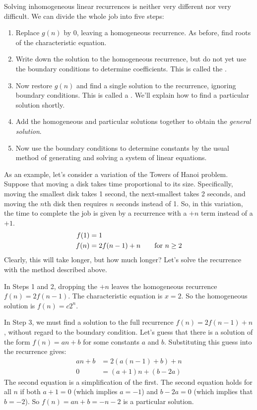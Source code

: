 Solving inhomogeneous linear recurrences is neither very different nor
very difficult. We can divide the whole job into five steps:

\begin{enumerate}

\item Replace $g(n)$ by 0, leaving a homogeneous recurrence.  As
  before, find roots of the characteristic equation.

\item Write down the solution to the homogeneous recurrence, but do
  not yet use the boundary conditions to determine coefficients.  This
  is called the .

\item Now restore $g(n)$ and find a single solution to the recurrence,
  ignoring boundary conditions.  This is called a .  We'll explain how to find a particular solution
  shortly.

\item Add the homogeneous and particular solutions together to obtain
  the \emph{general solution}.

\item Now use the boundary conditions to determine constants by the
  usual method of generating and solving a system of linear equations.

\end{enumerate}

As an example, let's consider a variation of the Towers of Hanoi
problem.  Suppose that moving a disk takes time proportional to its
size.  Specifically, moving the smallest disk takes 1 second, the
next-smallest takes 2 seconds, and moving the $n$th disk then
requires $n$ seconds instead of 1.  So, in this variation, the time to
complete the job is given by a recurrence with a $+n$ term instead of
a $+1$.
\begin{align*}
f(1) & = 1 \\
f(n) & = 2 f(n - 1) + n \text{\qquad for $n \geq 2$}
\end{align*}
Clearly, this will take longer, but how much longer?  Let's solve the
recurrence with the method described above.

In Steps 1 and 2, dropping the $+n$ leaves the homogeneous recurrence
$f(n) = 2 f(n -1)$.  The characteristic equation is $x = 2$.  So the
homogeneous solution is $f(n) = c2^n$.

In Step 3, we must find a solution to the full recurrence $f(n) = 2
f(n - 1) + n$, without regard to the boundary condition.  Let's guess
that there is a solution of the form $f(n) = a n + b$ for some
constants $a$ and $b$.  Substituting this guess into the recurrence
gives:
\begin{align*}
a n + b & = 2 (a (n - 1) + b) + n \\
0 & = (a + 1) n + (b - 2 a)
\end{align*}
The second equation is a simplification of the first.  The second
equation holds for all $n$ if both $a + 1 = 0$ (which implies $a =
-1$) and $b - 2a = 0$ (which implies that $b = -2$).  So $f(n) = an +
b = -n - 2$ is a particular solution.

